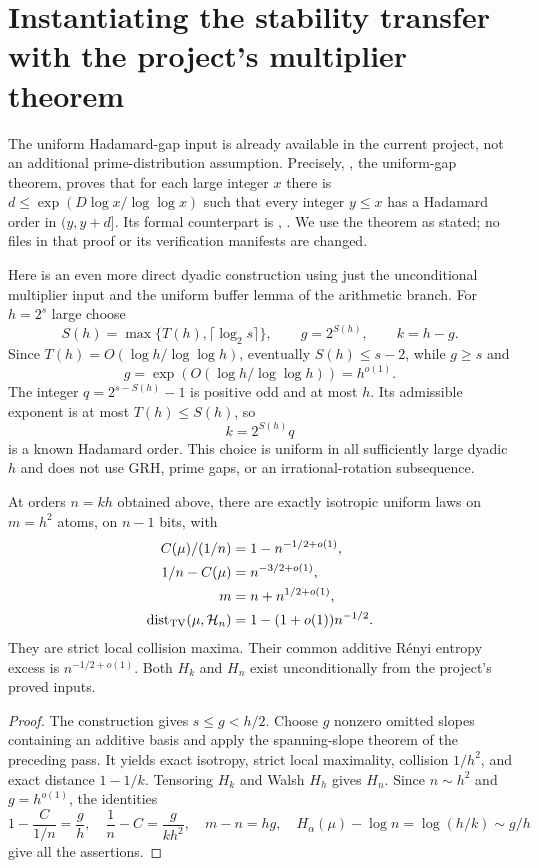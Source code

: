 \section{Instantiating the stability transfer with the project's multiplier theorem}
\label{sec:stability-project-input}

The uniform Hadamard-gap input is already available in the current
project, not an additional prime-distribution assumption. Precisely,
, the uniform-gap
theorem, proves that for each large integer $x$ there is
$d\le\exp(D\log x/\log\log x)$ such that every integer $y\le x$ has a
Hadamard order in $(y,y+d]$. Its formal counterpart is
,
. We use the theorem as stated;
no files in that proof or its verification manifests are changed.

Here is an even more direct dyadic construction using just the
unconditional multiplier input and the uniform buffer lemma of the
arithmetic branch. For $h=2^s$ large choose
\[
 S(h)=\max\{T(h),\lceil\log_2s\rceil\},\qquad
 g=2^{S(h)},\qquad k=h-g.
\]
Since $T(h)=O(\log h/\log\log h)$, eventually
$S(h)\le s-2$, while $g\ge s$ and
\[
                 g=\exp(O(\log h/\log\log h))=h^{o(1)}.
\]
The integer $q=2^{s-S(h)}-1$ is positive odd and at most $h$.
Its admissible exponent is at most $T(h)\le S(h)$, so
\[
                    k=2^{S(h)}q
\]
is a known Hadamard order. This choice is uniform in all sufficiently
large dyadic $h$ and does not use GRH, prime gaps, or an
irrational-rotation subsequence.

\begin{corollary}
\label{cor:stability-project-rate}
At orders $n=kh$ obtained above, there are exactly isotropic uniform
laws on $m=h^2$ atoms, on $n-1$ bits, with
\[
 \begin{split}
 C(\mu)/(1/n)&=1-n^{-1/2+o(1)},\\
 1/n-C(\mu)&=n^{-3/2+o(1)},\\
 m&=n+n^{1/2+o(1)},\\
 \operatorname{dist}_{\rm TV}(\mu,\mathcal H_n)
       &=1-(1+o(1))n^{-1/2}.
 \end{split}
\]
They are strict local collision maxima. Their common additive
R\'enyi entropy excess is $n^{-1/2+o(1)}$.
Both $H_k$ and $H_n$ exist unconditionally from the project's
proved inputs.
\end{corollary}
\begin{proof}
The construction gives $s\le g<h/2$. Choose $g$ nonzero omitted
slopes containing an additive basis and apply the spanning-slope
theorem of the preceding pass. It yields exact isotropy, strict
local maximality, collision $1/h^2$, and exact distance $1-1/k$.
Tensoring $H_k$ and Walsh $H_h$ gives $H_n$.
Since $n\sim h^2$ and $g=h^{o(1)}$, the identities
\[
 1-\frac{C}{1/n}=\frac gh,\quad
 \frac1n-C=\frac{g}{kh^2},\quad
 m-n=hg,\quad
 H_\alpha(\mu)-\log n=\log(h/k)\sim g/h
\]
give all the assertions.
\end{proof}

